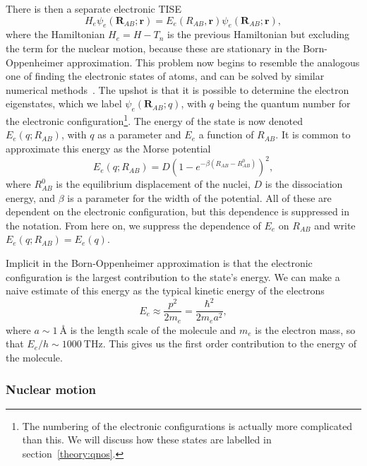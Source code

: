 There is then a separate electronic TISE
%
\begin{equation}
  H_e \psi_e(\mathbf{R}_{AB}; \mathbf{r}) = E_e(R_{AB}, \mathbf{r})\psi_e(\mathbf{R}_{AB};
  \mathbf{r}),
  \label{theory:eqn:TISEelectron}
\end{equation}
%
where the Hamiltonian $H_e = H - T_n$ is the previous Hamiltonian but excluding
the term for the nuclear motion, because these are stationary in the
Born-Oppenheimer approximation. This problem now begins to resemble the
analogous one of finding the electronic states of atoms, and can be solved by
similar numerical methods~\cite{Foot2005, bransden2003}. The upshot is that it
is possible to determine the electron eigenstates, which we label
$\psi_e(\mathbf{R}_{AB}; q)$, with $q$ being the quantum number for the
electronic configuration\footnote{The numbering of the electronic
configurations is actually more complicated than this. We will discuss how
these states are labelled in section~\ref{theory:qnos}.}. The energy of the
state is now denoted $E_e(q; R_{AB})$, with $q$ as a parameter and $E_e$ a
function of  $R_{AB}$.  It is common to approximate this energy as the Morse
potential
%
\begin{equation}
  E_e(q; R_{AB}) = D(1-e^{-\beta(R_{AB} - R_{AB}^0)})^2,
\end{equation}
%
where $R_{AB}^0$ is the equilibrium displacement of the nuclei, $D$ is the
dissociation energy, and $\beta$ is a parameter for the width of the
potential. All of these are dependent on the electronic configuration, but this
dependence is suppressed in the notation. From here on, we suppress the
dependence of $E_e$ on $R_{AB}$ and write $E_e(q; R_{AB}) = E_e(q)$.

Implicit in the Born-Oppenheimer approximation is that the electronic
configuration is the largest contribution to the state's energy. We can make a
naive estimate of this energy as the typical kinetic energy of the electrons
%
\begin{equation}
  E_e \approx \frac{p^2}{2m_e} = \frac{\hbar^2}{2m_e a^2},
\end{equation}
%
where $a\sim\SI{1}{\angstrom}$ is the length scale of the molecule and $m_e$ is
the electron mass, so that $E_e/h \sim \SI{1000}{\tera\hertz}$. This
gives us the first order contribution to the energy of the molecule. 

\subsubsection{Nuclear motion}

